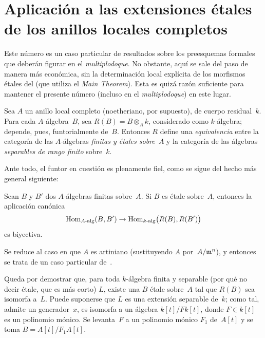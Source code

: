 \section{Aplicación a las extensiones étales de los anillos locales completos}
\label{I.6}

Este número es un caso particular de resultados sobre los preesquemas formales que deberán figurar en el \emph{multiplodoque}. No obstante, aquí se sale del paso de manera más económica, \ie sin la determinación local explícita de los morfismos étales del \No{} (que utiliza el \emph{Main Theorem}). Esta es quizá razón suficiente para mantener el presente número (incluso en el \emph{multiplodoque}) en este lugar.

\begin{theoreme}
\label{I.6.1}
Sea $A$ un anillo local completo (noetheriano, por supuesto), de cuerpo residual~$k$. Para cada $A$-álgebra~$B$, sea $R(B)=B\otimes_A k$, considerado como $k$-álgebra; depende, pues, funtorialmente de~$B$. Entonces $R$ define una \emph{equivalencia} entre la categoría de las $A$-álgebras \emph{finitas y étales sobre~$A$} y la categoría de las álgebras \emph{separables de rango finito} sobre~$k$.
\end{theoreme}

Ante todo, el funtor en cuestión es plenamente fiel, como se sigue del hecho más general siguiente:

\begin{corollaire}
\label{I.6.2}
Sean $B$ y $B'$ dos $A$-álgebras finitas sobre~$A$. Si $B$ es étale sobre~$A$, entonces la aplicación canónica
$$
\operatorname{Hom}_{\textup{$A$-alg}}(B,B')\to
\operatorname{Hom}_{\textup{$k$-alg}}\bigl(R(B),R(B')\bigr)
$$
es biyectiva.
\end{corollaire}

Se reduce al caso en que $A$ es artiniano (sustituyendo $A$ por~$A/\mathfrak{m}^n$), y entonces se trata de un caso particular de~.

Queda por demostrar que, para toda $k$-álgebra finita y separable (por qué no decir étale, que es más corto) $L$, existe una $B$ étale sobre~$A$ tal que $R(B)$ sea isomorfa a~$L$. Puede suponerse que $L$ es una extensión separable de~$k$; como tal, admite un generador~$x$, \ie es isomorfa a un álgebra $k[t]/Fk[t]$, donde $F\in k[t]$ es un polinomio mónico. Se levanta~$F$ a un polinomio mónico $F_1$ de~$A[t]$ y se toma $B=A[t]/F_1A[t]$.

